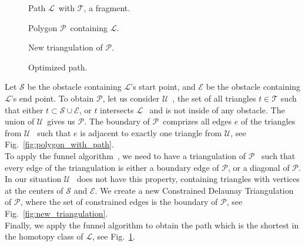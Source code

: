 \documentclass{gd-llncs}
\newcommand{\cdt}{$\mathcal{T}$}
\newcommand{\unpath}{$\mathcal{L}$}
\newcommand{\triset}{$\mathcal{U}$}
\newcommand{\plg}{$\mathcal{P}$}
\begin{document}
{\begin{figure}[!tbp]
  \centering
  \begin{minipage}[b]{0.45\textwidth}
    
    \caption{Path \unpath~with \cdt, a fragment.}
    \label{fig:non_opt_path_L}
  \end{minipage}
  \hfill
  \begin{minipage}[b]{0.45\textwidth}
    
    \caption{Polygon \plg~containing \unpath.}
    \label{fig:polygon_with_path}
  \end{minipage}
  \vfill
  \begin{minipage}[b]{0.45\textwidth}
    
    \caption{New triangulation of \plg.}
    \label{fig:new_triangulation}
  \end{minipage}
  \hfill
  \begin{minipage}[b]{0.45\textwidth}
    
    \caption{Optimized path.}
    \label{fig:optimized_path}
  \end{minipage}
\end{figure}
Let $\mathcal{S}$ be the obstacle containing \unpath's start point, and $\mathcal{E}$ be the obstacle containing \unpath's end point.
To obtain \plg, let us consider \triset~, the set of all triangles ${t} \in \mathcal{T}$ such that
either ${t} \subset \mathcal{S} \cup \mathcal{E}$, or $t$ intersects \unpath~ and is not inside of any obstacle.
The union of \triset~gives us \plg. The boundary of \plg~comprizes all edges $e$ of the triangles from \triset~ such that $e$ is adjacent to exactly one triangle from \triset, see Fig.~\ref{fig:polygon_with_path}. \\
To apply the funnel algorithm~\cite{chazelle1982theorem,hershberger1994computing}, we need to have a triangulation of \plg~ such that every edge of the triangulation is either a boundary edge of \plg, or a diagonal of \plg. In our situation \triset~ does not have this property, containing triangles with vertices at the centers of $\mathcal{S}$ and $\mathcal{E}$. We create a new Constrained Delaunay Triangulation of \plg, where the set of constrained edges is the boundary of \plg, see Fig.~\ref{fig:new_triangulation}.\\
Finally, we apply the funnel algorithm to obtain the path which is the shortest in the homotopy class of \unpath, see Fig.~\ref{fig:optimized_path}.\\

}
\end{document}
